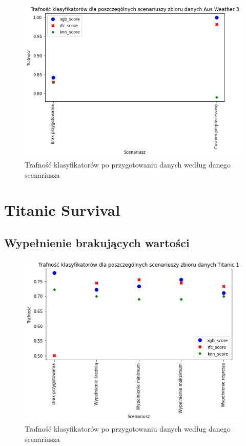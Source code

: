 \documentclass{book}
\begin{document}
\begin{figure}[H]
\centerline{\includegraphics{Aus_Weather_3_Custom}}
\centering
\caption{Trafność klasyfikatorów po przygotowaniu danych 
według danego scenariusza}
\end{figure}


\section{Titanic Survival}


\subsection{Wypełnienie brakujących wartości}
\begin{figure}[H]
\centerline{\includegraphics{Titanic_1_Wypełnienie_brakujących}}
\centering
\caption{Trafność klasyfikatorów po przygotowaniu danych 
według danego scenariusza}
\end{figure}
\end{document}
